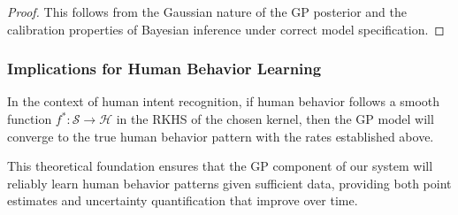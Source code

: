 \begin{proof}
This follows from the Gaussian nature of the GP posterior and the calibration properties of Bayesian inference under correct model specification.
\end{proof}

\subsubsection{Implications for Human Behavior Learning}

\begin{corollary}
In the context of human intent recognition, if human behavior follows a smooth function $f^*: \mathcal{S} \rightarrow \mathcal{H}$ in the RKHS of the chosen kernel, then the GP model will converge to the true human behavior pattern with the rates established above.
\end{corollary}

This theoretical foundation ensures that the GP component of our system will reliably learn human behavior patterns given sufficient data, providing both point estimates and uncertainty quantification that improve over time.